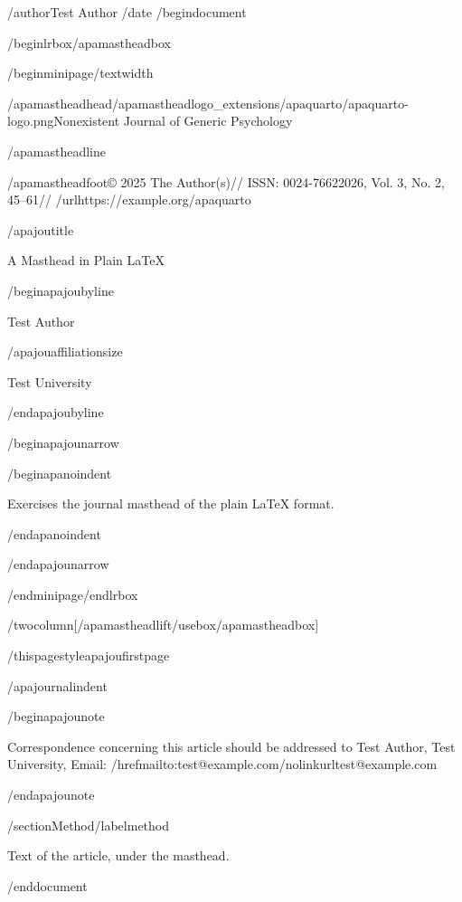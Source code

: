 /author{Test Author}
/date{}
/begin{document}


/begin{lrbox}{/apamastheadbox}%

/begin{minipage}{/textwidth}

/apamastheadhead{/apamastheadlogo{_extensions/apaquarto/apaquarto-logo.png}}{Nonexistent
Journal of Generic Psychology}

/apamastheadline

/apamastheadfoot{© 2025 The Author(s)//
ISSN: 0024-7662}{2026, Vol. 3, No. 2, 45--61//
/url{https://example.org/apaquarto}}

/apajoutitle{

A Masthead in Plain LaTeX

}

/begin{apajoubyline}

Test Author

/apajouaffiliationsize

Test University

/end{apajoubyline}

/begin{apajounarrow}

/begin{apanoindent}

Exercises the journal masthead of the plain LaTeX format.

/end{apanoindent}

/end{apajounarrow}

/end{minipage}/end{lrbox}

/twocolumn[/apamastheadlift/usebox{/apamastheadbox}]

/thispagestyle{apajoufirstpage}

/apajournalindent

/begin{apajounote}

Correspondence concerning this article should be addressed to Test
Author, Test University, Email:
/href{mailto:test@example.com}{/nolinkurl{test@example.com}}

/end{apajounote}

/section{Method}/label{method}

Text of the article, under the masthead.




/end{document}
